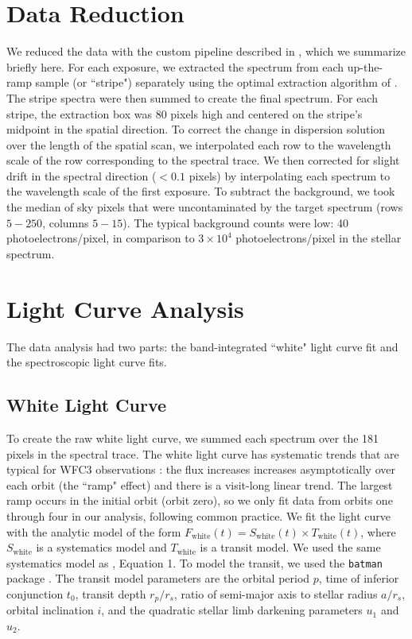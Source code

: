 \documentclass[twocolumn]{aastex61}
\begin{document}
\section{Data Reduction}
We reduced the data with the custom pipeline described in \cite{kreidberg14a}, which we summarize briefly here. For each exposure, we extracted the spectrum from each up-the-ramp sample (or ``stripe") separately using the optimal extraction algorithm of \cite{horne86}. The stripe spectra were then summed to create the final spectrum. For each stripe, the extraction box was 80 pixels high and centered on the stripe's midpoint in the spatial direction. To correct the change in dispersion solution over the length of the spatial scan, we interpolated each row to the wavelength scale of the row corresponding to the spectral trace. We then corrected for slight drift in the spectral direction ($<0.1$ pixels) by interpolating each spectrum to the wavelength scale of the first exposure.  To subtract the background, we took the median of sky pixels that were uncontaminated by the target spectrum (rows $5-250$, columns $5-15$). The typical background counts were low: 40 photoelectrons/pixel, in comparison to $3\times10^4$ photoelectrons/pixel in the stellar spectrum.

\section{Light Curve Analysis}
The data analysis had two parts: the band-integrated ``white" light curve fit and the spectroscopic light curve fits.

\subsection{White Light Curve}
To create the raw white light curve, we summed each spectrum over the 181 pixels in the spectral trace.  The white light curve has systematic trends that are typical for WFC3 observations \citep{zhou17}: the flux increases increases asymptotically over each orbit (the ``ramp" effect) and there is a visit-long linear trend. The largest ramp occurs in the initial orbit (orbit zero), so we only fit data from orbits one through four in our analysis, following common practice.  We fit the light curve with the analytic model of the form $F_\mathrm{white}(t) = S_\mathrm{white}(t)\times T_\mathrm{white}(t)$, where $S_\mathrm{white}$ is a systematics model and $T_\mathrm{white}$ is a transit model. We used the same systematics model as \cite{kreidberg15b}, Equation 1.  To model the transit, we used the \texttt{batman} package \citep{kreidberg15a}.  The transit model parameters are the orbital period $p$, time of inferior conjunction $t_0$, transit depth $r_p/r_s$, ratio of semi-major axis to stellar radius $a/r_s$, orbital inclination $i$, and the quadratic stellar limb darkening parameters $u_1$ and $u_2$.
\end{document}
